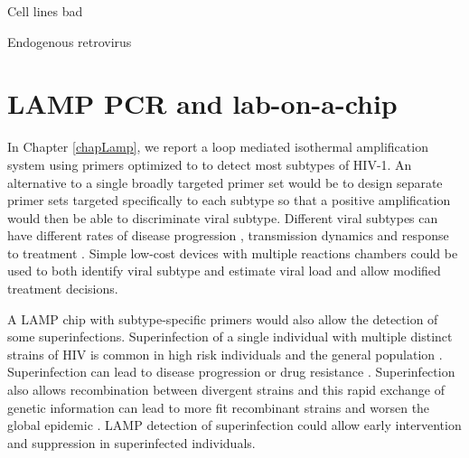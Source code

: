 \documentclass[../sherrill-Mix_thesis.tex]{subfiles}
\begin{document}
Cell lines bad

Endogenous retrovirus

\section{LAMP PCR and lab-on-a-chip}
		In Chapter \ref{chapLamp}, we report a loop mediated isothermal amplification system using primers optimized to to detect most subtypes of HIV-1. An alternative to a single broadly targeted primer set would be to design separate primer sets targeted specifically to each subtype so that a positive amplification would then be able to discriminate viral subtype. Different viral subtypes can have different rates of disease progression \citep{Kanki1999,Kaleebu2002,Baeten2007,Kiwanuka2008}, transmission dynamics \citep{Renjifo2004,John-Stewart2005,Huang2007b} and response to treatment \citep{Snoeck2006,Easterbrook2010,Scherrer2011}. Simple low-cost devices with multiple reactions chambers could be used to both identify viral subtype and estimate viral load \citep{Liu2014a,Mauk2015} and allow modified treatment decisions.
		
		A LAMP chip with subtype-specific primers would also allow the detection of some superinfections. Superinfection of a single individual with multiple distinct strains of HIV is common in high risk individuals \citep{Piantadosi2007,Powell2009,Ronen2013,Wagner2013,Redd2014} and the general population \citep{Redd2012a}. Superinfection can lead to disease progression \citep{Jost2002,Fang2004,Blick2007,Gottlieb2007,Streeck2008,Clerc2010} or drug resistance \citep{Smith2005}. Superinfection also allows recombination between divergent strains \citep{Fang2004,Pernas2006,Blick2007,Piantadosi2007,Streeck2008} and this rapid exchange of genetic information can lead to more fit recombinant strains and worsen the global epidemic \citep{Robertson1995,Gao1999,Hahn2000,Malim2001,Blick2007}. LAMP detection of superinfection could allow early intervention and suppression in superinfected individuals.
\end{document}
